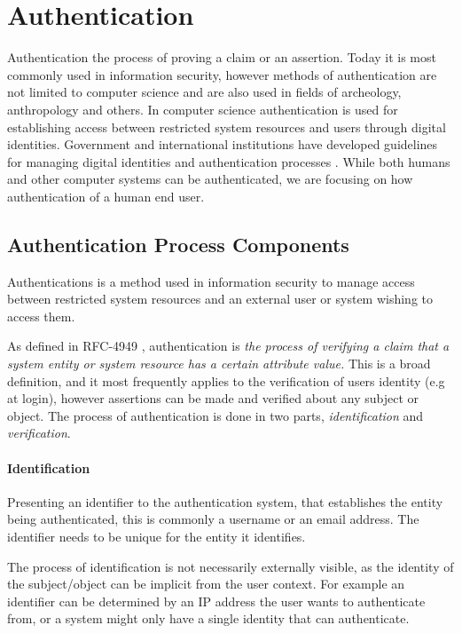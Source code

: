 \section{Authentication}

Authentication the process of proving a claim or an assertion.
Today it is most commonly used in information security, however methods of authentication are not limited to computer science and are also used in fields of archeology, anthropology and others.
\bigskip
\newline
In computer science authentication is used for establishing access between restricted system resources and users through digital identities.
Government and international institutions have developed guidelines for managing digital identities and authentication processes \cite{grassi2017} .
\bigskip
\newline %
While both humans and other computer systems can be authenticated, we are focusing on how authentication of a human end user.




\subsection{Authentication Process Components}
Authentications is a method used in information security to manage access between restricted system resources and an external user or system wishing to access them.

As defined in RFC-4949 \cite{shirey2007internet}, authentication is \textit{the process of verifying a claim that a system entity or system resource has a certain attribute value.}
This is a broad definition, and it most frequently applies to the verification of users identity (e.g at login), however assertions can be made and verified about any subject or object.
The process of authentication is done in two parts, \textit{identification} and \textit{verification}.

\paragraph{Identification} Presenting an identifier to the authentication system, that establishes the entity being authenticated, this is commonly a username or an email address.
The identifier needs to be unique for the entity it identifies.

The process of identification is not necessarily externally visible, as the identity of the subject/object can be implicit from the user context. 
For example an identifier can be determined by an IP address the user wants to authenticate from, or a system might only have a single identity that can authenticate.

